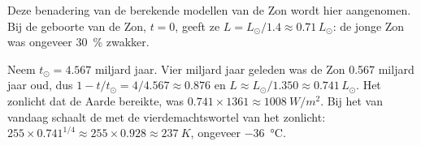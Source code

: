 Deze benadering van de berekende modellen van de Zon wordt hier aangenomen. Bij de
geboorte van de Zon, $t = 0$, geeft ze $L = L_\odot/1.4 \approx 0.71\,L_\odot$:
de jonge Zon was ongeveer \qty{30}{\percent} zwakker.

\begin{example}\label{ex:g12:early-earth:young-sun}
Neem $t_\odot = 4.567$ miljard jaar. Vier miljard jaar geleden was de Zon
0.567 miljard jaar oud, dus $1 - t/t_\odot = 4/4.567 \approx 0.876$ en
$L \approx L_\odot/1.350 \approx 0.741\,L_\odot$. Het zonlicht dat de
Aarde bereikte, was $0.741 \times 1361 \approx \qty{1008}{W/m^2}$. Bij het
 van vandaag schaalt de  met de vierdemachtswortel van het
zonlicht: $255 \times 0.741^{1/4} \approx 255 \times 0.928 \approx
\qty{237}{K}$, ongeveer \qty{-36}{\celsius}.
\end{example}

